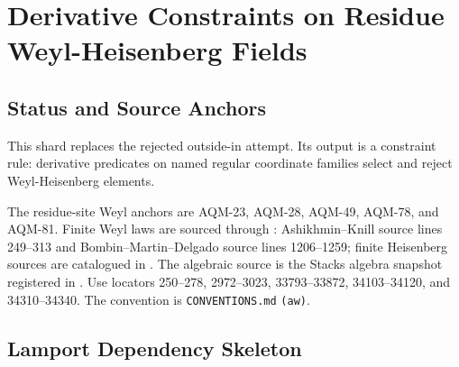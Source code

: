 
\section{Derivative Constraints on Residue Weyl-Heisenberg Fields}
\label{sec:derivative-constraints-residue-weyl}

\subsection{Status and Source Anchors}

This shard replaces the rejected outside-in attempt.  Its output is a
constraint rule: derivative predicates on named regular coordinate families
select and reject Weyl-Heisenberg elements.

The residue-site Weyl anchors are AQM-23, AQM-28, AQM-49, AQM-78, and AQM-81.
Finite Weyl laws are sourced through
: Ashikhmin--Knill
source lines 249--313 and Bombin--Martin--Delgado source lines 1206--1259;
finite Heisenberg sources are catalogued in
.  The algebraic source is the
Stacks algebra snapshot registered in
.  Use locators
250--278, 2972--3023, 33793--33872, 34103--34120, and 34310--34340.
The convention is \texttt{CONVENTIONS.md} \texttt{(aw)}.

\subsection{Lamport Dependency Skeleton}

